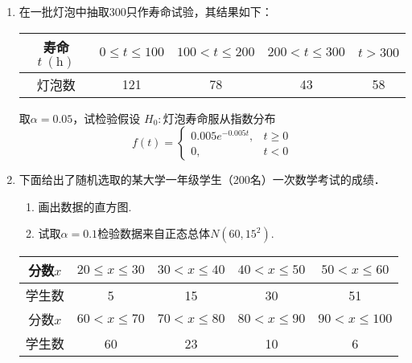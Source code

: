 \documentclass[10pt,a4paper]{article}
\begin{document}
\begin{enumerate}
    \item 在一批灯泡中抽取300只作寿命试验，其结果如下：
    \renewcommand{\arraystretch}{1.3}
    \begin{table}[H]\centering
        \begin{tabular}{c|cccc}
        寿命$t\ (\mathrm{h})$ & $0\leq t\leq 100$ & $100<t\leq 200$ & $200<t\leq 300$ & $t>300$ \\ \hline
        灯泡数              & 121               & 78              & 43              & 58     
        \end{tabular}
    \end{table}
    \renewcommand{\arraystretch}{1.0}
    取$\alpha=0.05$，试检验假设
    $H_0:$灯泡寿命服从指数分布
    $$f(t)=\left\{\begin{array}{ll}
        0.005e^{-0.005t}, & t\geq 0 \\
        0, & t<0
    \end{array}\right.$$



    \item 下面给出了随机选取的某大学一年级学生（200名）一次数学考试的成绩．
    \begin{enumerate}
        \item 画出数据的直方图.
        \item 试取$\alpha=0.1$检验数据来自正态总体$N(60,15^2)$.
    \end{enumerate}
    \renewcommand{\arraystretch}{1.3}
    \begin{table}[H]\centering
        \begin{tabular}{c|cccc}
        \hline
        分数$x$ & $20\leq x\leq 30$ & $30<x\leq 40$ & $40<x\leq 50$ & $50<x\leq 60$  \\ \hline
        学生数   & 5                 & 15            & 30            & 51             \\ \hline
        分数$x$ & $60<x\leq 70$     & $70<x\leq 80$ & $80<x\leq 90$ & $90<x\leq 100$ \\ \hline
        学生数   & 60                & 23            & 10            & 6              \\ \hline
        \end{tabular}
    \end{table}
    \renewcommand{\arraystretch}{1.0}






\end{enumerate}
\end{document}

